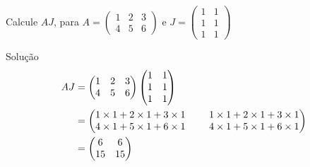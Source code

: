 \begin{question}
Calcule $AJ$, para \;
\(
  A =
  \begin{pmatrix}
    1 & 2 & 3 \\
    4 & 5 & 6
  \end{pmatrix}
 \)
 \; e \;
 \(
  J =
  \begin{pmatrix}
    1 & 1 \\
    1 & 1 \\
    1 & 1
  \end{pmatrix}
\)
\end{question}

\begin{resolution}{Solução}
\begin{align*}
  AJ
  & =
  \begin{pmatrix}
    1 & 2 & 3 \\
    4 & 5 & 6
  \end{pmatrix}
  \begin{pmatrix}
    1 & 1 \\
    1 & 1 \\
    1 & 1
  \end{pmatrix}
  \\
  & \setlength{\arraycolsep}{12pt}
  = \begin{pmatrix}
    1\times1+2\times1+3\times1 & 1\times1+2\times1+3\times1 \\
    4\times1+5\times1+6\times1 & 4\times1+5\times1+6\times1
  \end{pmatrix}
  \\
  & =
  \begin{pmatrix}
    6  & 6  \\
    15 & 15
  \end{pmatrix}
\end{align*}
\end{resolution}

